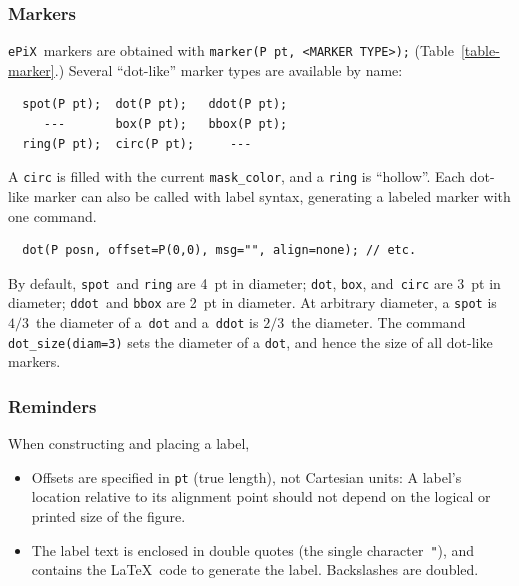 \documentclass[12pt,letterpaper]{book}
\newcommand{\code}[1]{\texttt{#1}}
\newcommand{\ePiX}{\code{ePiX}}
\newcommand{\teximath}[1]{$#1$}
\newcommand{\findex}[1]{\ignorespaces}
\begin{document}
\subsubsection*{Markers}

\ePiX\ markers are obtained with \verb+marker(P pt, <MARKER TYPE>);+
(Table~\ref{table-marker}.)
Several ``dot-like'' marker types are available by name: 
\findex{spot}
\findex{dot}
\findex{ddot}
\findex{box}
\findex{bbox}
\findex{ring}
\findex{circ}
\begin{verbatim}
  spot(P pt);  dot(P pt);   ddot(P pt);
     ---       box(P pt);   bbox(P pt);  
  ring(P pt);  circ(P pt);     ---
\end{verbatim}
A \code{circ} is filled with the current \code{mask\_color}, and a
\code{ring} is ``hollow''.  Each dot-like marker can also be called
with label syntax, generating a labeled marker with one command.
\begin{verbatim}
  dot(P posn, offset=P(0,0), msg="", align=none); // etc.
\end{verbatim}

\findex{dot\_size}
By default, \code{spot}~and \code{ring} are 4~pt in diameter;
\code{dot}, \code{box}, and~\code{circ} are 3~pt in diameter;
\code{ddot}~and \code{bbox} are 2~pt in diameter. At arbitrary
diameter, a \code{spot} is \teximath{4/3}~the diameter of a~\code{dot}
and a~\code{ddot} is \teximath{2/3}~the diameter.  The command
\code{dot\_size(diam=3)} sets the diameter of a \code{dot}, and hence
the size of all dot-like markers.

\begin{table}[tb]
  \begin{center}
    
  \end{center}
  \caption{\ePiX's \code{marker} types.}
  \label{table-marker}
\end{table}


\subsubsection*{Reminders}

%
When constructing and placing a label,
\begin{itemize}
\item Offsets are specified in \code{pt} (true length), not Cartesian
  units: A label's location relative to its alignment point should not
  depend on the logical or printed size of the figure.

\item The label text is enclosed in double quotes (the single
  character~\code{"}), and contains the \LaTeX\ code to generate the
  label. Backslashes are doubled.
\end{itemize}
\end{document}
